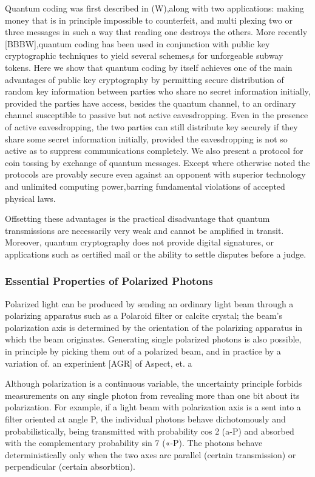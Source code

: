 Quantum coding was first described in (W),along with two applications: making money that is in principle impossible to counterfeit, and multi plex­ing two or three messages in such a way that reading one destroys the others. More recently [BBBW],quantum coding has been used in conjunction with public key cryptographic techniques to yield several schemes,s for unforgeable subway tokens. Here we show that quantum coding by itself achieves one of the main advantages of public key cryptography by per­mitting secure distribution of random key informa­tion between parties who share no secret information initially, provided the parties have access, besides the quantum channel, to an ordinary channel suscep­tible to passive but not active eavesdropping. Even in the presence of active eavesdropping, the two parties can still distribute key securely if they share some secret information initially, provided the eavesdropping is not so active as to suppress communications completely. We also present a proto­col for coin tossing by exchange of quantum mes­sages. Except where otherwise noted the protocols are provably secure even against an opponent with superior technology and unlimited computing power,barring fundamental violations of accepted physical laws.

Offsetting these advantages is the practical disadvantage that quantum transmissions are neces­sarily very weak and cannot be amplified in transit. Moreover, quantum cryptography does not provide di­gital signatures, or applications such as certified mail or the ability to settle disputes before a judge.

\subsubsection{Essential Properties of Polarized Photons}

Polarized light can be produced by sending an ordinary light beam through a polarizing apparatus such as a Polaroid filter or calcite crystal; the beam's polarization axis is determined by the orien­tation of the polarizing apparatus in which the beam originates. Generating single polarized photons is also possible, in principle by picking them out of a polarized beam, and in practice by a variation of. an experinient [AGR] of Aspect, et. a

Although polarization is a continuous varia­ble, the uncertainty principle forbids measurements on any single photon from revealing more than one bit about its polarization. For example, if a light beam with polarization axis is a sent into a filter oriented at angle P, the individual photons behave dichotomously and probabilistically, being transmit­ted with probability cos 2 (a-P) and absorbed with the complementary probability sin 7 («-P). The photons behave deterministically only when the two axes arc parallel (certain transmission) or perpendicular (certain absorbtion).

